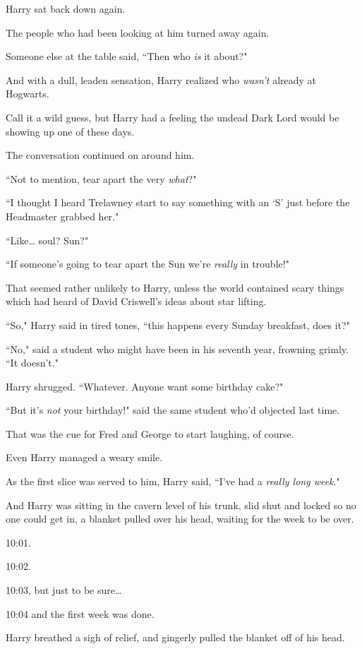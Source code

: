 Harry sat back down again.

The people who had been looking at him turned away again.

Someone else at the table said, ``Then who \emph{is} it about?"

And with a dull, leaden sensation, Harry realized who \emph{wasn't} already at Hogwarts.

Call it a wild guess, but Harry had a feeling the undead Dark Lord would be showing up one of these days.

The conversation continued on around him.

``Not to mention, tear apart the very \emph{what}?"

``I thought I heard Trelawney start to say something with an `S' just before the Headmaster grabbed her."

``Like{\ldots} soul? Sun?"

``If someone's going to tear apart the Sun we're \emph{really} in trouble!"

That seemed rather unlikely to Harry, unless the world contained scary things which had heard of David Criswell's ideas about star lifting.

``So," Harry said in tired tones, ``this happens every Sunday breakfast, does it?"

``No," said a student who might have been in his seventh year, frowning grimly. ``It doesn't."

Harry shrugged. ``Whatever. Anyone want some birthday cake?"

``But it's \emph{not} your birthday!" said the same student who'd objected last time.

That was the cue for Fred and George to start laughing, of course.

Even Harry managed a weary smile.

As the first slice was served to him, Harry said, ``I've had a \emph{really long week}."

\later

And Harry was sitting in the cavern level of his trunk, slid shut and locked so no one could get in, a blanket pulled over his head, waiting for the week to be over.

10:01.

10:02.

10:03, but just to be sure{\ldots}

10:04 and the first week was done.

Harry breathed a sigh of relief, and gingerly pulled the blanket off of his head.

